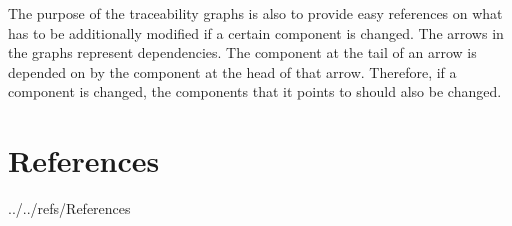 \documentclass[12pt]{article}
\begin{document}
The purpose of the traceability graphs is also to provide easy references on
what has to be additionally modified if a certain component is changed.  The
arrows in the graphs represent dependencies. The component at the tail of an
arrow is depended on by the component at the head of that arrow. Therefore, if a
component is changed, the components that it points to should also be
changed. 


\newpage

\section{References}


 {../../refs/References}

%




\newpage

\newpage
\end{document}
